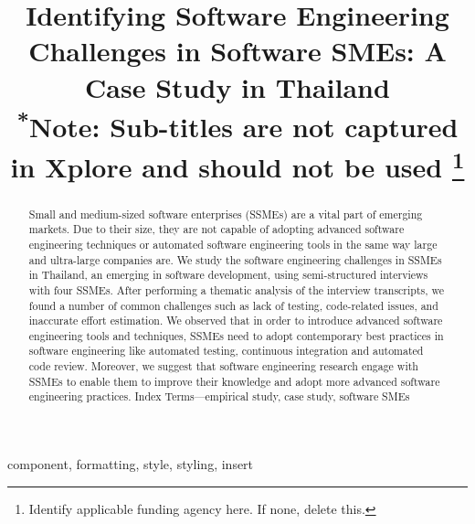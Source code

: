 \documentclass[conference]{IEEEtran}
\begin{document}
\title{Identifying Software Engineering Challenges in
Software SMEs: A Case Study in Thailand\\
{\footnotesize \textsuperscript{*}Note: Sub-titles are not captured in Xplore and
should not be used}
\thanks{Identify applicable funding agency here. If none, delete this.}
}

\author{
}

\maketitle

\begin{abstract}
Small and medium-sized software enterprises
(SSMEs) are a vital part of emerging markets. Due to their size,
they are not capable of adopting advanced software engineering
techniques or automated software engineering tools in the same
way large and ultra-large companies are. We study the software
engineering challenges in SSMEs in Thailand, an emerging in software development, using semi-structured interviews
with four SSMEs. After performing a thematic analysis of the
interview transcripts, we found a number of common challenges
such as lack of testing, code-related issues, and inaccurate effort
estimation. We observed that in order to introduce advanced software engineering tools and techniques, SSMEs need
to adopt contemporary best practices in software engineering like
automated testing, continuous integration and automated code
review. Moreover, we suggest that software engineering research
engage with SSMEs to enable them to improve their knowledge
and adopt more advanced software engineering practices.
Index Terms—empirical study, case study, software SMEs
\end{abstract}

\begin{IEEEkeywords}
component, formatting, style, styling, insert
\end{IEEEkeywords}
\end{document}
